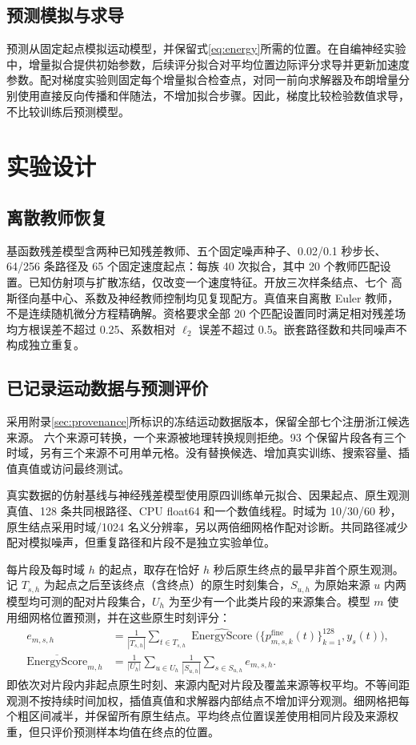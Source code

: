 \documentclass[UTF8,11pt]{ctexart}
\begin{document}
\subsection{预测模拟与求导}
预测从固定起点模拟运动模型，并保留式\eqref{eq:energy}所需的位置。在自编神经实验中，增量拟合提供初始参数，后续评分拟合对平均位置边际评分求导并更新加速度参数。配对梯度实验则固定每个增量拟合检查点，对同一前向求解器及布朗增量分别使用直接反向传播和伴随法，不增加拟合步骤。因此，梯度比较检验数值求导，不比较训练后预测模型。

\section{实验设计}\label{sec:design}
\subsection{离散教师恢复}\label{sec:recovery-design}
基函数残差模型含两种已知残差教师、五个固定噪声种子、0.02/0.1 秒步长、64/256 条路径及 65 个固定速度起点：每族 40 次拟合，其中 20 个教师匹配设置。已知仿射项与扩散冻结，仅改变一个速度特征。开放三次样条结点、七个 高斯径向基中心、系数及神经教师控制均见复现配方。真值来自离散 Euler 教师，不是连续随机微分方程精确解。资格要求全部 20 个匹配设置同时满足相对残差场 均方根误差不超过 0.25、系数相对 $\ell_2$ 误差不超过 0.5。嵌套路径数和共同噪声不构成独立重复。

\subsection{已记录运动数据与预测评价}\label{sec:real-design}
采用附录\ref{sec:provenance}所标识的冻结运动数据版本，保留全部七个注册浙江候选来源。 六个来源可转换，一个来源被地理转换规则拒绝。93 个保留片段各有三个时域，另有三个来源不可用单元格。没有替换候选、增加真实训练、搜索容量、插值真值或访问最终测试。

真实数据的仿射基线与神经残差模型使用原四训练单元拟合、因果起点、原生观测真值、128 条共同根路径、CPU float64 和一个数值线程。时域为 10/30/60 秒，原生结点采用时域/1024 名义分辨率，另以两倍细网格作配对诊断。共同路径减少配对模拟噪声，但重复路径和片段不是独立实验单位。

每片段及每时域 $h$ 的起点，取存在恰好 $h$ 秒后原生终点的最早非首个原生观测。记 $T_{s,h}$ 为起点之后至该终点（含终点）的原生时刻集合，$S_{u,h}$ 为原始来源 $u$ 内两模型均可测的配对片段集合，$U_h$ 为至少有一个此类片段的来源集合。模型 $m$ 使用细网格位置预测，并在这些原生时刻评分：
\begin{equation}\label{eq:real-score}
\begin{aligned}
 e_{m,s,h}&=\frac{1}{|T_{s,h}|}\sum_{t\in T_{s,h}}
 \widehat{\operatorname{EnergyScore}}\bigl(\{p^{\mathrm{fine}}_{m,s,k}(t)\}_{k=1}^{128},y_s(t)\bigr),\\
 \overline{\operatorname{EnergyScore}}_{m,h}&=\frac{1}{|U_h|}\sum_{u\in U_h}
 \frac{1}{|S_{u,h}|}\sum_{s\in S_{u,h}} e_{m,s,h}.
\end{aligned}
\end{equation}
即依次对片段内非起点原生时刻、来源内配对片段及覆盖来源等权平均。不等间距观测不按持续时间加权，插值真值和求解器内部结点不增加评分观测。细网格把每个粗区间减半，并保留所有原生结点。平均终点位置误差使用相同片段及来源权重，但只评价预测样本均值在终点的位置。
\end{document}
